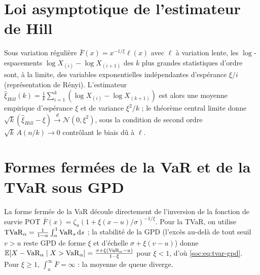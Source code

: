 \section{Loi asymptotique de l'estimateur de Hill}
\label{soc:ann:hill}
Sous variation régulière $\bar F(x)=x^{-1/\xi}\ell(x)$ avec $\ell$ à variation lente, les $\log$-espacements $\log X_{(i)}-\log X_{(i+1)}$ des $k$ plus grandes statistiques d'ordre sont, à la limite, des variables exponentielles indépendantes d'espérance $\xi/i$ (représentation de Rényi). L'estimateur $\hat\xi_{Hill}(k)=\frac1k\sum_{i=1}^k(\log X_{(i)}-\log X_{(k+1)})$ est alors une moyenne empirique d'espérance $\xi$ et de variance $\xi^2/k$ ; le théorème central limite donne $\sqrt k(\hat\xi_{Hill}-\xi)\xrightarrow{d}\mathcal N(0,\xi^2)$, sous la condition de second ordre $\sqrt k\,A(n/k)\to0$ contrôlant le biais dû à $\ell$.


\section{Formes fermées de la VaR et de la TVaR sous GPD}
\label{soc:ann:varestvar}
La forme fermée de la VaR découle directement de l'inversion de la fonction de survie POT $\bar F(x)=\zeta_u(1+\xi(x-u)/\sigma)^{-1/\xi}$. Pour la TVaR, on utilise $\mathrm{TVaR}_\alpha=\frac{1}{1-\alpha}\int_\alpha^1\mathrm{VaR}_s\,\mathrm{d} s$ ; la stabilité de la GPD (l'excès au-delà de tout seuil $v>u$ reste GPD de forme $\xi$ et d'échelle $\sigma+\xi(v-u)$) donne $\mathbb{E}[X-\mathrm{VaR}_\alpha\mid X>\mathrm{VaR}_\alpha]=\frac{\sigma+\xi(\mathrm{VaR}_\alpha-u)}{1-\xi}$ pour $\xi<1$, d'où \eqref{soc:eq:tvar-gpd}. Pour $\xi\ge1$, $\int_u^\infty\bar F=\infty$ : la moyenne de queue diverge.


